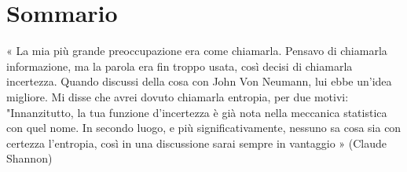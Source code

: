 \chapter*{Sommario} %
\label{sommario}


« La mia più grande preoccupazione era come chiamarla. Pensavo di chiamarla informazione, ma la parola era fin troppo usata, così decisi di chiamarla incertezza. Quando discussi della cosa con John Von Neumann, lui ebbe un'idea migliore. Mi disse che avrei dovuto chiamarla entropia, per due motivi: "Innanzitutto, la tua funzione d'incertezza è già nota nella meccanica statistica con quel nome. In secondo luogo, e più significativamente, nessuno sa cosa sia con certezza l'entropia, così in una discussione sarai sempre in vantaggio » (Claude Shannon) 





